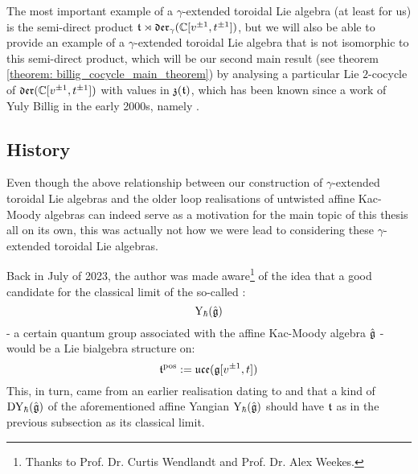         The most important example of a $\gamma$-extended toroidal Lie algebra (at least for us) is the semi-direct product $\mathfrak{t} \rtimes \mathfrak{der}_{\gamma}(\mathbb{C}[v^{\pm 1}, t^{\pm 1}])$, but we will also be able to provide an example of a $\gamma$-extended toroidal Lie algebra that is not isomorphic to this semi-direct product, which will be our second main result (see theorem \ref{theorem: billig_cocycle_main_theorem}) by analysing a particular Lie $2$-cocycle of $\mathfrak{der}(\mathbb{C}[v^{\pm 1}, t^{\pm 1}])$ with values in $\mathfrak{z}(\mathfrak{t})$, which has been known since a work of Yuly Billig in the early 2000s, namely \cite{billig_energy_momentum_tensor}. 

    \subsection{History} \label{subsection: history}
        Even though the above relationship between our construction of $\gamma$-extended toroidal Lie algebras and the older loop realisations of untwisted affine Kac-Moody algebras can indeed serve as a motivation for the main topic of this thesis all on its own, this was actually not how we were lead to considering these $\gamma$-extended toroidal Lie algebras.

        Back in July of 2023, the author was made aware\footnote{Thanks to Prof. Dr. Curtis Wendlandt and Prof. Dr. Alex Weekes.} of the idea that a good candidate for the classical limit of the so-called :
            $$\mathrm{Y}_{\hbar}(\hat{\mathfrak{g}})$$
        - a certain quantum group associated with the affine Kac-Moody algebra $\hat{\mathfrak{g}}$ - would be a Lie bialgebra structure on:
            $$\mathfrak{t}^{\mathrm{pos}} := \mathfrak{uce}(\mathfrak{g}[v^{\pm 1}, t])$$
        This, in turn, came from an earlier realisation dating to \cite{wendlandt_formal_shift_operators_on_yangian_doubles} and \cite{guay_nakajima_wendlandt_affine_yangian_vertex_representations_and_PBW} that a kind of  $\mathrm{D}\mathrm{Y}_{\hbar}(\hat{\mathfrak{g}})$ of the aforementioned affine Yangian $\mathrm{Y}_{\hbar}(\hat{\mathfrak{g}})$ should have $\mathfrak{t}$ as in the previous subsection as its classical limit. 
        
